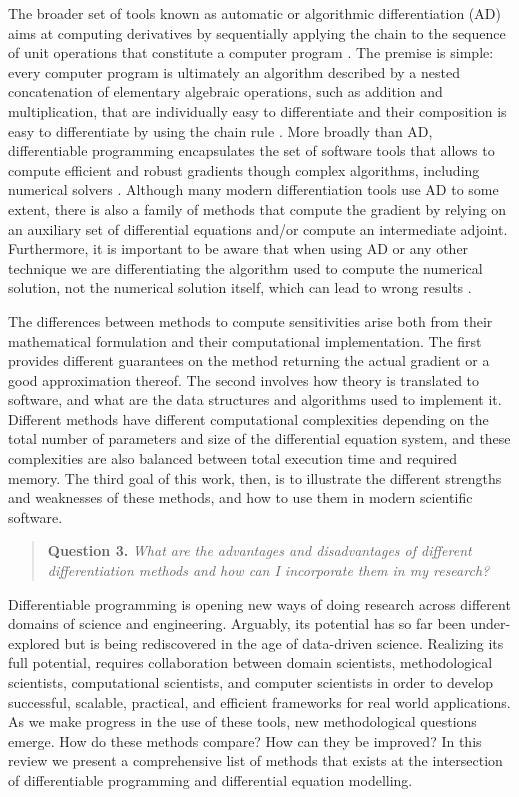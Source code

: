 The broader set of tools known as automatic or algorithmic differentiation (AD) aims at computing derivatives by sequentially applying the chain to the sequence of unit operations that constitute a computer program \cite{Griewank:2008kh, Naumann.2011}. 
The premise is simple: every computer program is ultimately an algorithm described by a nested concatenation of elementary algebraic operations, such as addition and multiplication, that are individually easy to differentiate and their composition is easy to differentiate by using the chain rule \cite{Giering:1998in}. 
More broadly than AD, differentiable programming encapsulates the set of software tools that allows to compute efficient and robust gradients though complex algorithms, including numerical solvers \cite{Innes_Zygote}. 
Although many modern differentiation tools use AD to some extent, there is also a family of methods that compute the gradient by relying on an auxiliary set of differential equations and/or compute an intermediate adjoint. 
Furthermore, it is important to be aware that when using AD or any other technique we are differentiating the algorithm used to compute the numerical solution, not the numerical solution itself, which can lead to wrong results \cite{Eberhard_Bischof_1996}.

The differences between methods to compute sensitivities arise both from their mathematical formulation and their computational implementation. 
The first provides different guarantees on the method returning the actual gradient or a good approximation thereof. 
The second involves how theory is translated to software, and what are the data structures and algorithms used to implement it. 
Different methods have different computational complexities depending on the total number of parameters and size of the differential equation system, and these complexities are also balanced between total execution time and required memory. 
The third goal of this work, then, is to illustrate the different strengths and weaknesses of these methods, and how to use them in modern scientific software. 
\begin{quote}
    \textbf{Question 3. }
    \textit{What are the advantages and disadvantages of different differentiation methods and how can I incorporate them in my research?}
\end{quote}

Differentiable programming is opening new ways of doing research across different domains of science and engineering. 
Arguably, its potential has so far been under-explored but is being rediscovered in the age of data-driven science. 
Realizing its full potential, requires collaboration between domain scientists, methodological scientists, computational scientists, and computer scientists in order to develop successful, scalable, practical, and efficient frameworks for real world applications.
As we make progress in the use of these tools, new methodological questions emerge. 
How do these methods compare? How can they be improved? 
In this review we present a comprehensive list of methods that exists at the intersection of differentiable programming and differential equation modelling. 

